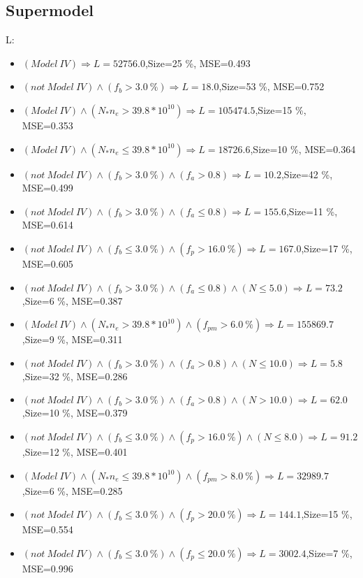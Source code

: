 \documentclass[numbered]{CSL}
\begin{document}
\subsection{Supermodel}
L:
\begin{itemize}
\item $(Model~IV) \Rightarrow L = 52756.0$,\hfill Size=25 \%, MSE=0.493
\item $(not~Model~IV) \land (f_b > 3.0~\%) \Rightarrow L = 18.0$,\hfill Size=53 \%, MSE=0.752
\item $(Model~IV) \land (N_* n_e > 39.8 * 10^{10}) \Rightarrow L = 105474.5$,\hfill Size=15 \%, MSE=0.353
\item $(Model~IV) \land (N_* n_e \leq 39.8 * 10^{10}) \Rightarrow L = 18726.6$,\hfill Size=10 \%, MSE=0.364
\item $(not~Model~IV) \land (f_b > 3.0~\%) \land (f_a > 0.8) \Rightarrow L = 10.2$,\hfill Size=42 \%, MSE=0.499
\item $(not~Model~IV) \land (f_b > 3.0~\%) \land (f_a \leq 0.8) \Rightarrow L = 155.6$,\hfill Size=11 \%, MSE=0.614
\item $(not~Model~IV) \land (f_b \leq 3.0~\%) \land (f_p > 16.0~\%) \Rightarrow L = 167.0$,\hfill Size=17 \%, MSE=0.605
\item $(not~Model~IV) \land (f_b > 3.0~\%) \land (f_a \leq 0.8) \land (N \leq 5.0) \Rightarrow L = 73.2$,\hfill Size=6 \%, MSE=0.387
\item $(Model~IV) \land (N_* n_e > 39.8 * 10^{10}) \land (f_{pm} > 6.0~\%) \Rightarrow L = 155869.7$,\hfill Size=9 \%, MSE=0.311
\item $(not~Model~IV) \land (f_b > 3.0~\%) \land (f_a > 0.8) \land (N \leq 10.0) \Rightarrow L = 5.8$,\hfill Size=32 \%, MSE=0.286
\item $(not~Model~IV) \land (f_b > 3.0~\%) \land (f_a > 0.8) \land (N > 10.0) \Rightarrow L = 62.0$,\hfill Size=10 \%, MSE=0.379
\item $(not~Model~IV) \land (f_b \leq 3.0~\%) \land (f_p > 16.0~\%) \land (N \leq 8.0) \Rightarrow L = 91.2$,\hfill Size=12 \%, MSE=0.401
\item $(Model~IV) \land (N_* n_e \leq 39.8 * 10^{10}) \land (f_{pm} > 8.0~\%) \Rightarrow L = 32989.7$,\hfill Size=6 \%, MSE=0.285
\item $(not~Model~IV) \land (f_b \leq 3.0~\%) \land (f_p > 20.0~\%) \Rightarrow L = 144.1$,\hfill Size=15 \%, MSE=0.554
\item $(not~Model~IV) \land (f_b \leq 3.0~\%) \land (f_p \leq 20.0~\%) \Rightarrow L = 3002.4$,\hfill Size=7 \%, MSE=0.996

\end{itemize}
\end{document}

